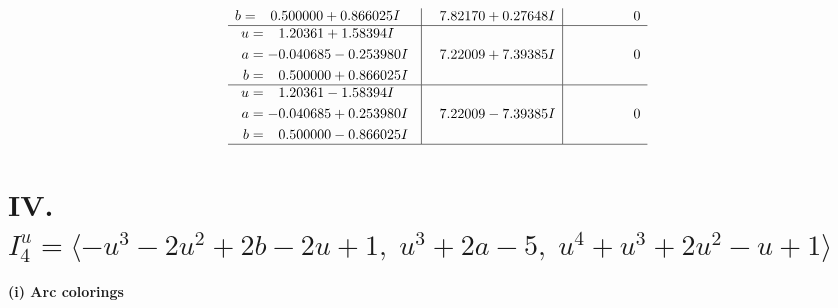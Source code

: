 \documentclass[1p]{elsarticle_modified}
\theoremstyle{definition}
\begin{document}
$$\begin{array}{c|c|c}
\begin{aligned}
b &= \phantom{-}0.500000 + 0.866025 I\end{aligned}
 & \phantom{-}7.82170 + 0.27648 I & \phantom{-0.000000 } 0 \\ \hline\begin{aligned}
u &= \phantom{-}1.20361 + 1.58394 I \\
a &= -0.040685 - 0.253980 I \\
b &= \phantom{-}0.500000 + 0.866025 I\end{aligned}
 & \phantom{-}7.22009 + 7.39385 I & \phantom{-0.000000 } 0 \\ \hline\begin{aligned}
u &= \phantom{-}1.20361 - 1.58394 I \\
a &= -0.040685 + 0.253980 I \\
b &= \phantom{-}0.500000 - 0.866025 I\end{aligned}
 & \phantom{-}7.22009 - 7.39385 I & \phantom{-0.000000 } 0\\
 \hline 
 \end{array}$$\newpage\newpage\renewcommand{\arraystretch}{1}
\centering \section*{IV. $I^u_{4}= \langle - u^3-2 u^2+2 b-2 u+1,\;u^3+2 a-5,\;u^4+u^3+2 u^2- u+1 \rangle$}
\flushleft \textbf{(i) Arc colorings}\\
\end{document}
